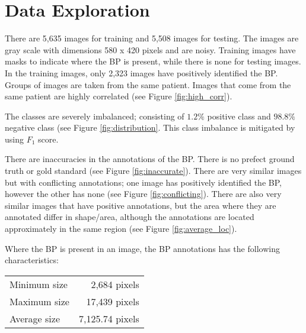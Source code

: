 \section{Data Exploration}
There are 5,635 images for training and 5,508 images for testing. The images are gray scale with dimensions 580 x 420 pixels and are noisy. Training images have masks to indicate where the BP is present, while there is none for testing images. In the training images, only 2,323 images have positively identified the BP.
Groups of images are taken from the same patient.  Images that come from the same patient are highly correlated (see Figure \ref{fig:high_corr}).

The classes are severely imbalanced; consisting of $1.2\%$ positive class and $98.8\%$ negative class (see Figure \ref{fig:distribution}. This class imbalance is mitigated by using $F_1$ score.

There are inaccuracies in the annotations of the BP. There is no prefect ground truth or gold standard (see Figure \ref{fig:inaccurate}). There are very similar images but with conflicting annotations; one image has positively identified the BP, however the other has none (see Figure \ref{fig:conflicting}). There are also very similar images that have positive annotations, but the area where they are annotated differ in shape/area, although the annotations are located approximately in the same region (see Figure \ref{fig:average_loc}).

Where the BP is present in an image, the BP annotations has the following characteristics:

\begin{center}
\begin{tabular}{l r}
Minimum size &    2,684 pixels \\
Maximum size &   17,439 pixels \\
Average size & 7,125.74 pixels \\
\end{tabular}
\end{center}
